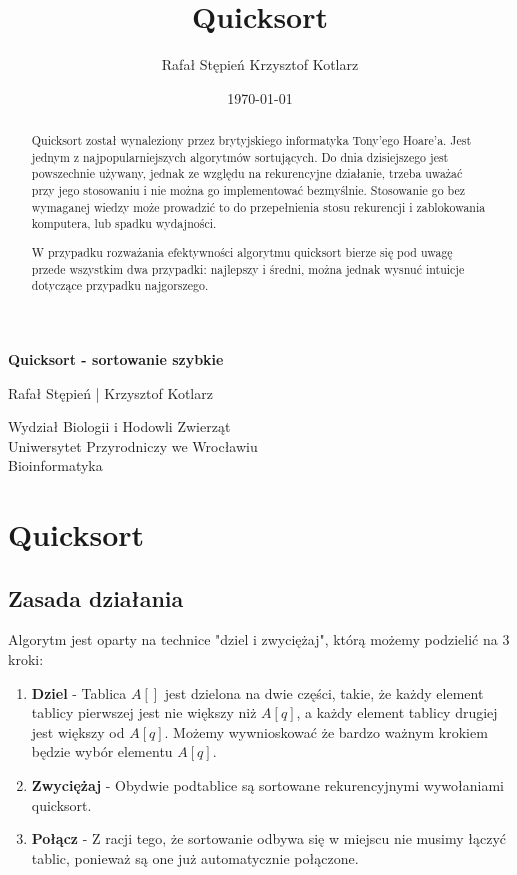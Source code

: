 \documentclass[a4paper,11pt]{report}
\title{Quicksort}
\author{Rafał Stępień Krzysztof Kotlarz}
\date{\today}
\begin{document}
\renewcommand{\tabcolsep}{10mm}

\begin{titlepage}
   \begin{center}
       \vspace*{9cm}
 
       \textbf{\huge{Quicksort - sortowanie szybkie}}
 
       \vspace{1.5cm}
 
       Rafał Stępień | Krzysztof Kotlarz \\
       \vspace{2cm}

 
       Wydział Biologii i Hodowli Zwierząt\\
       Uniwersytet Przyrodniczy we Wrocławiu\\
       Bioinformatyka\\
 
   \end{center}
\end{titlepage}
\newpage
\tableofcontents
\begin{abstract}
Quicksort został wynaleziony przez brytyjskiego informatyka Tony'ego Hoare'a. Jest jednym z najpopularniejszych algorytmów sortujących. Do dnia dzisiejszego jest powszechnie używany, jednak ze względu na rekurencyjne działanie, trzeba uważać przy jego stosowaniu i nie można go implementować bezmyślnie. Stosowanie go bez wymaganej wiedzy może prowadzić to do przepełnienia stosu rekurencji i zablokowania komputera, lub spadku wydajności.



W przypadku rozważania efektywności algorytmu quicksort bierze się pod uwagę przede wszystkim dwa przypadki: najlepszy i średni, można jednak wysnuć intuicje dotyczące przypadku najgorszego.
\end{abstract}

\chapter{Quicksort}
\section{Zasada działania}
Algorytm jest oparty na technice "dziel i zwyciężaj", którą możemy podzielić na 3 kroki:
\begin{enumerate}
\item \textbf{Dziel} - Tablica $A[]$ jest dzielona na dwie części, takie, że każdy element tablicy pierwszej jest nie większy niż $A[q]$, a każdy element tablicy drugiej jest większy od $A[q]$. Możemy wywnioskować że bardzo ważnym krokiem będzie wybór elementu $A[q]$.
\item \textbf{Zwyciężaj} - Obydwie podtablice są sortowane rekurencyjnymi wywołaniami quicksort.
\item \textbf{Połącz} - Z racji tego, że sortowanie odbywa się w miejscu nie musimy łączyć tablic, ponieważ są one już automatycznie połączone.
\end{enumerate}
\end{document}
